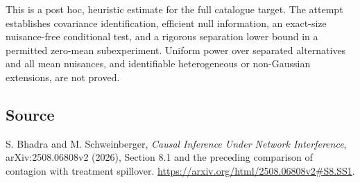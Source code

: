 \documentclass[11pt]{article}
\begin{document}
This is a post hoc, heuristic estimate for the full catalogue target.
The attempt establishes covariance identification, efficient null information, an exact-size nuisance-free conditional test, and a rigorous separation lower bound in a permitted zero-mean subexperiment. Uniform power over separated alternatives and all mean nuisances, and identifiable heterogeneous or non-Gaussian extensions, are not proved.

\subsection*{Source}
S. Bhadra and M. Schweinberger, \emph{Causal Inference Under Network
Interference}, arXiv:2508.06808v2 (2026), Section 8.1 and the preceding
comparison of contagion with treatment spillover.
\url{https://arxiv.org/html/2508.06808v2#S8.SS1}.
\end{document}
